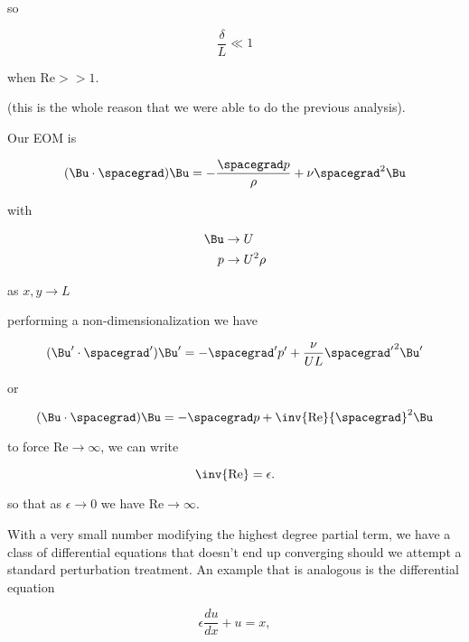 so 

\begin{equation}\label{eqn:continuumL19:530}
\frac{\delta}{L} \ll 1
\end{equation}

when $\text{Re} >> 1$.

(this is the whole reason that we were able to do the previous analysis).

Our EOM is

\begin{equation}\label{eqn:continuumL19:550}
(\Bu \cdot \spacegrad) \Bu = -\frac{\spacegrad p}{\rho } + \nu \spacegrad^2 \Bu
\end{equation}

with 

\begin{align}\label{eqn:continuumL19:570}
\Bu &\rightarrow U \\
p &\rightarrow U^2 \rho
\end{align}

as $x, y \rightarrow L$

performing a non-dimensionalization we have

\begin{equation}\label{eqn:continuumL19:590}
(\Bu' \cdot \spacegrad') \Bu' = -\spacegrad' p' + \frac{\nu}{U L} {\spacegrad'}^2 \Bu'
\end{equation}

or

\begin{equation}\label{eqn:continuumL19:610}
(\Bu \cdot \spacegrad) \Bu = -\spacegrad p + \inv{\text{Re}} {\spacegrad}^2 \Bu
\end{equation}

to force $\text{Re} \rightarrow \infty$, we can write

\begin{equation}\label{eqn:continuumL19:630}
\inv{\text{Re}} = \epsilon.
\end{equation}

so that as $\epsilon \rightarrow 0$ we have $\text{Re} \rightarrow \infty$.

With a very small number modifying the highest degree partial term, we have a class of differential equations that doesn't end up converging should we attempt a standard perturbation treatment.  An example that is analogous is the differential equation

\begin{equation}\label{eqn:continuumL19:650}
\epsilon \frac{du}{dx} + u = x,
\end{equation}

